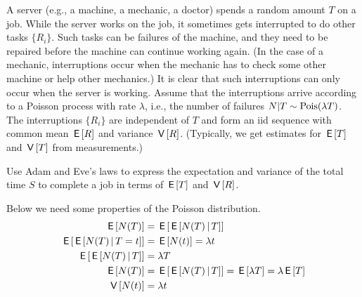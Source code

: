 \documentclass[lectures]{subfiles}
\begin{document}
\begin{exercise}
A server (e.g., a machine, a mechanic, a doctor) spends a random amount $T$ on a job.
While the server works on the job, it sometimes gets interrupted to do other tasks $\{R_{i}\}$.
Such tasks can be failures of the machine, and they need to be repaired before the machine can continue working again.
(In the case of a mechanic, interruptions occur when the mechanic has to check some other machine or help other mechanics.)
It is clear that such interruptions can only occur when the server is working.
Assume that the interruptions arrive according to a Poisson process with rate $\lambda$, i.e., the number of failures $N| T \sim\mathrm{Pois}(\lambda T)$.
The interruptions $\{R_{i}\}$ are independent of $T$ and form an iid sequence with common mean $\,\mathsf{E}\left[R\right]$ and variance $\,\mathsf{V}\left[R\right]$.
(Typically, we get estimates for $\,\mathsf{E}\left[T\right]$ and $\,\mathsf{V}\left[T\right]$ from measurements.)

Use Adam and Eve's laws to express the expectation and variance of the total time $S$ to complete a job in terms of $\,\mathsf{E}\left[T\right]$ and $\,\mathsf{V}\left[R\right]$.
\begin{solution}

Below we need some properties of the Poisson distribution.
\begin{align}
\,\mathsf{E}\left[N(T)\right] &= \,\mathsf{E}\left[\,\mathsf{E}\left[N(T)\,\middle|\, T\right]\right]\\
\,\mathsf{E}\left[\,\mathsf{E}\left[N(T)\,\middle|\, T=t\right]\right]&= \,\mathsf{E}\left[N(t)\right] = \lambda t \\
\,\mathsf{E}\left[\,\mathsf{E}\left[N(T)\,\middle|\, T\right]\right]&= \lambda T \\
\,\mathsf{E}\left[N(T)\right] &= \,\mathsf{E}\left[\,\mathsf{E}\left[N(T)\,\middle|\, T\right]\right] = \,\mathsf{E}\left[\lambda T\right] = \lambda \,\mathsf{E}\left[T\right]\\
\,\mathsf{V}\left[N(t)\right] &= \lambda t
\end{align}


\end{solution}
\end{exercise}
\end{document}
